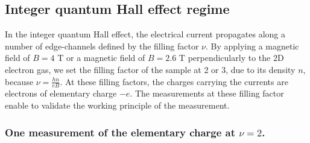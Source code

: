 \subsection{Integer quantum Hall effect regime}

In the integer quantum Hall effect, the electrical current propagates along a number of edge-channels defined by the filling factor $\nu$.
By applying a magnetic field of $B = 4$ T or a magnetic field of $B = 2.6$ T perpendicularly to the 2D electron gas, we set the filling factor of the sample at 2 or 3, due to its density $n$, because $\nu = \frac{hn}{eB}$.
At these filling factors, the charges carrying the currents are electrons of elementary charge $-e$.
The measurements at these filling factor enable to validate the working principle of the measurement.

\subsubsection*{One measurement of the elementary charge at $\nu=2$.}


